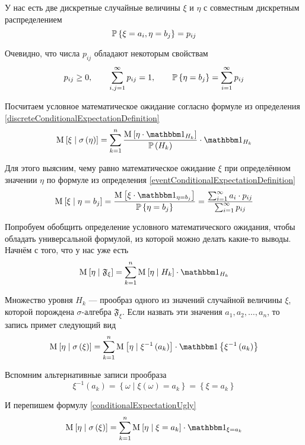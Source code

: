 \begin{example}\label{discreteConditionalExpectationExample}
    У нас есть две дискретные случайные величины $\xi$ и $\eta$
    с совместным дискретным распределением
    $$\mathbb{P}\left\{ \xi = a_i, \eta = b_j \right\} = p_{ij}$$

    Очевидно, что числа $p_{ij}$ обладают некоторым свойствам
    $$p_{ij} \ge 0, \qquad \sum_{i,j=1}^\infty p_{ij} = 1,
        \qquad \mathbb{P}\left\{ \eta = b_j \right\} = \sum_{i=1}^\infty p_{ij}$$

    Посчитаем условное математическое ожидание согласно формуле
    из определения \eqref{discreteConditionalExpectationDefinition}
    $$\Mean{\xi \mid \sigma\left( \eta \right)} = \sum_{k=1}^n
        \frac{\Mean{\eta \cdot \indicatorof{H_k}}}{\probability{H_k}}
        \cdot \indicatorof{H_k}$$

    Для этого выясним, чему равно математическое ожидание $\xi$
    при определённом значении $\eta$ по формуле из определения
    \eqref{eventConditionalExpectationDefinition}
    $$\Mean{\xi \mid \eta = b_j}
        = \frac{\Mean{\xi \cdot \indicatorof{\eta = b_j}}}{
            \Probability{\eta = b_j}}
        = \frac{\sum_{i=1}^{\infty} a_i \cdot p_{ij}}{
            \sum_{i=1}^{\infty} p_{ij}}$$
\end{example}

Попробуем обобщить определение условного математического ожидания,
чтобы обладать универсальной формулой, из которой можно делать какие-то выводы.
Начнём с того, что у нас уже есть
$$\Mean{ \eta \mid \mathfrak{F}_\xi }
    = \sum_{k=1}^n \Mean{ \eta \mid H_k } \cdot \indicatorof{H_k}$$

Множество уровня $H_k$ --- прообраз одного из значений случайной величины $\xi$,
которой порождена $\sigma$-алгебра $\mathfrak{F}_\xi$.
Если назвать эти значения $a_1, a_2, \dots, a_n$, то запись примет следующий вид
\begin{equation}\label{conditionalExpectationUgly}
    \Mean{ \eta \mid \sigma\left( \xi \right) }
        = \sum_{k=1}^n \Mean{\eta \mid \xi^{-1}\left( a_k \right)}
            \cdot \Indicator{\xi^{-1}\left( a_k \right)}
\end{equation}

Вспомним альтернативные записи прообраза
$$\xi^{-1}\left( a_k \right)
    = \left\{ \omega \mid \xi\left( \omega \right) = a_k \right\}
    = \left\{ \xi = a_k \right\}$$

И перепишем формулу \eqref{conditionalExpectationUgly}
$$\Mean{ \eta \mid \sigma\left( \xi \right) }
    = \sum_{k=1}^n \Mean{\eta \mid \xi = a_k}
        \cdot \indicatorof{\xi = a_k}$$

